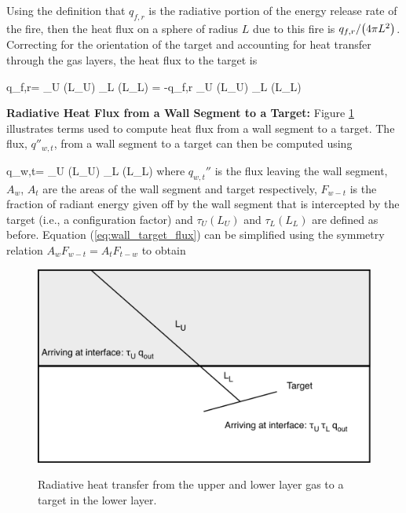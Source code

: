 Using the definition that $q_{f,r}$ is the radiative portion of the energy release rate of the fire, then the heat flux on a sphere of radius $L$ due to this fire is $q_{f,r} / { \left( {4 \pi L^2} \right) }$. Correcting for the orientation of the target and accounting for heat transfer through the gas layers, the heat flux to the target is

\be q_{f,r}\dprime =  \cos {} \tau_U (L_U) \tau_L (L_L) = -q_{f,r}  \tau_U (L_U) \tau_L (L_L) \ee

{\bf Radiative Heat Flux from a Wall Segment to a Target:} Figure \ref{fig:Rad_Gases} illustrates terms used to compute heat flux from a wall segment to a target. The flux, $q\dprime_{w,t}$, from a wall segment to a target can then be computed using

\be q_{w,t}\dprime =  \tau_U (L_U) \tau_L (L_L) \label{eq:wall_target_flux} \ee
where $q_{w,t}\dprime$  is the flux leaving the wall segment, $A_w$, $A_t$ are the areas of the wall segment and target respectively, $F_{w-t}$  is the fraction of radiant energy given off by the wall segment that is
intercepted by the target (i.e., a configuration factor) and $\tau_U (L_U)$ and $\tau_L (L_L)$ are defined as before. Equation (\ref{eq:wall_target_flux})  can be simplified using the symmetry relation $A_w F_{w-t}  = A_t F_{t-w}$ to obtain

\begin{figure}
\begin{center}
\includegraphics[width=5.0in]{FIGURES/Theory/Radiation_Gases}\\
\end{center}
\caption{Radiative heat transfer from the upper and lower layer gas to a target in the lower layer.}
 \label{fig:Rad_Gases}
\end{figure}

